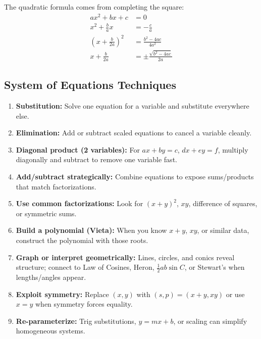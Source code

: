 \documentclass[12pt]{extarticle}
\begin{document}
\begin{conceptbox}
The quadratic formula comes from completing the square:
\begin{align*}
ax^2 + bx + c &= 0 \\
x^2 + \frac{b}{a}x &= -\frac{c}{a} \\
\left(x + \frac{b}{2a}\right)^2 &= \frac{b^2-4ac}{4a^2} \\
x + \frac{b}{2a} &= \pm \frac{\sqrt{b^2-4ac}}{2a}
\end{align*}
\end{conceptbox}

\subsection{System of Equations Techniques}

\begin{conceptbox}
\begin{enumerate}
    \item \textbf{Substitution:} Solve one equation for a variable and substitute everywhere else.
    \item \textbf{Elimination:} Add or subtract scaled equations to cancel a variable cleanly.
    \item \textbf{Diagonal product (2 variables):} For $ax+by=c$, $dx+ey=f$, multiply diagonally and subtract to remove one variable fast.
    \item \textbf{Add/subtract strategically:} Combine equations to expose sums/products that match factorizations.
    \item \textbf{Use common factorizations:} Look for $(x+y)^2$, $xy$, difference of squares, or symmetric sums.
    \item \textbf{Build a polynomial (Vieta):} When you know $x+y$, $xy$, or similar data, construct the polynomial with those roots.
    \item \textbf{Graph or interpret geometrically:} Lines, circles, and conics reveal structure; connect to Law of Cosines, Heron, $\tfrac12ab\sin C$, or Stewart's when lengths/angles appear.
    \item \textbf{Exploit symmetry:} Replace $(x,y)$ with $(s,p) = (x+y, xy)$ or use $x=y$ when symmetry forces equality.
    \item \textbf{Re-parameterize:} Trig substitutions, $y=mx+b$, or scaling can simplify homogeneous systems.
\end{enumerate}
\end{conceptbox}
\end{document}
